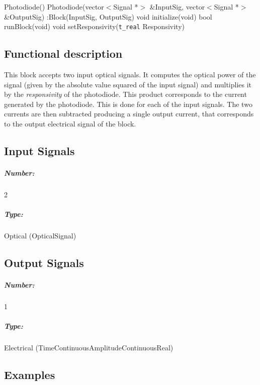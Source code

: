 Photodiode() {}
\bigbreak
Photodiode(vector$<$Signal *$>$ \&InputSig, vector$<$Signal *$>$ \&OutputSig) :Block(InputSig, OutputSig) {}
\bigbreak
void initialize(void)
\bigbreak
bool runBlock(void)
\bigbreak
void setResponsivity(\texttt{t\_real} Responsivity)

\subsection*{Functional description}

This block accepts two input optical signals. It computes the optical power of the signal (given by the absolute value squared of the input signal) and multiplies it by the \textit{responsivity} of the photodiode. This product corresponds to the current generated by the photodiode. This is done for each of the input signals. The two currents are then subtracted producing a single output current, that corresponds to the output electrical signal of the block.

\subsection*{Input Signals}

\subparagraph*{Number:} 2

\subparagraph*{Type:} Optical (OpticalSignal)

\subsection*{Output Signals}

\subparagraph*{Number:} 1

\subparagraph*{Type:} Electrical (TimeContinuousAmplitudeContinuousReal)

\subsection*{Examples} 

